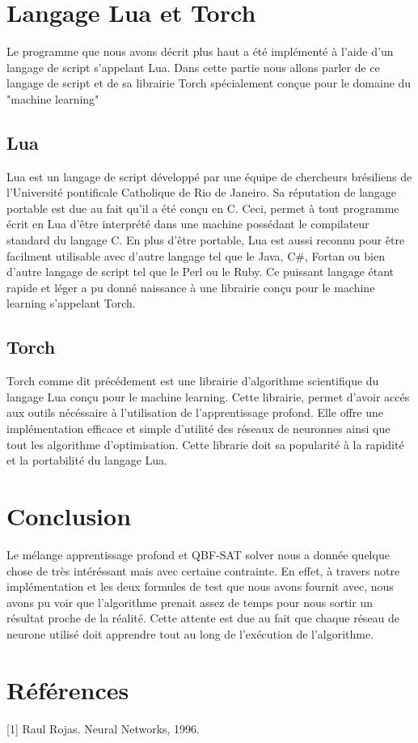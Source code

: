 \documentclass{article}
\begin{document}
\section{Langage Lua et Torch}
Le programme que nous avons décrit plus haut a été implémenté à l'aide d'un langage de script s'appelant Lua. Dans cette partie nous allons parler de ce langage de script et de sa librairie Torch spécialement conçue pour le domaine du "machine learning" 
	\subsection{Lua}
	Lua est un langage de script développé par une équipe de chercheurs brésiliens de l'Université pontificale Catholique de Rio de Janeiro.
	Sa réputation de langage portable est due au fait qu'il a été conçu en C. Ceci, permet à tout programme écrit en Lua d'être interprété dans une machine possédant le compilateur standard du langage C.
En plus d'être portable, Lua est aussi reconnu pour être facilment utilisable avec d'autre langage tel que le Java, C\#, Fortan ou bien d'autre langage de script tel que le Perl ou le Ruby.
Ce puissant langage étant rapide et léger a pu donné naissance à une librairie conçu pour le machine learning s'appelant Torch.
	
	\subsection{Torch}
	Torch comme dit précédement est une librairie d'algorithme scientifique du langage Lua conçu pour le machine learning. Cette librairie, permet d'avoir accés aux outils nécéssaire à l'utilisation de l'apprentissage profond. Elle offre une implémentation efficace et simple d'utilité des réseaux de neuronnes ainsi que tout les algorithme d'optimisation. Cette librarie doit sa popularité à la rapidité et la portabilité du langage Lua.
\newpage 
\section{Conclusion}
Le mélange apprentissage profond et QBF-SAT solver nous a donnée quelque chose de très intéréssant mais avec certaine contrainte. En effet, à travers notre implémentation et les deux formules de test que nous avons fournit avec, nous avons pu voir que l'algorithme prenait assez de temps pour nous sortir un résultat proche de la réalité. Cette attente est due au fait que chaque réseau de neurone utilisé doit apprendre tout au long de l'exécution de l'algorithme.

\newpage

\section{Références}
[1] Raul Rojas. Neural Networks, 1996. 
  
\end{document}
